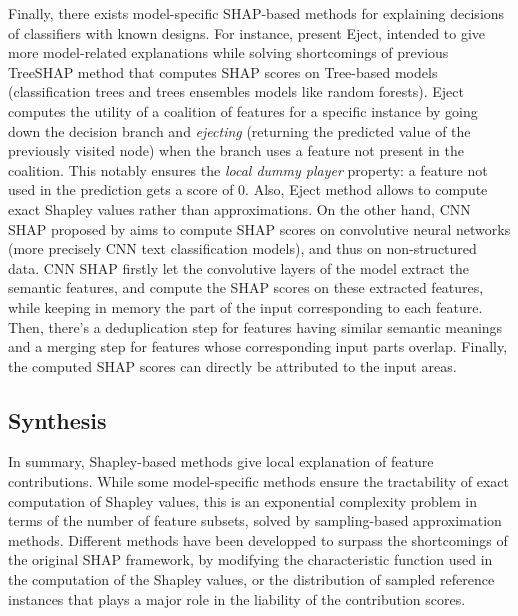 Finally, there exists model-specific SHAP-based methods for explaining decisions of classifiers with known designs. 
For instance, \textcite{campbell_exact_2022} present Eject, intended to give more model-related explanations while 
solving shortcomings of previous TreeSHAP method that computes SHAP scores on Tree-based models (classification 
trees and trees ensembles models like random forests). Eject computes the utility of a coalition of features 
for a specific instance by going down the decision branch and \textit{ejecting} (returning the predicted value of the 
previously visited node) when the branch uses a feature not present in the coalition. This notably ensures the 
\textit{local dummy player} property: a feature not used in the prediction gets a score of 0. Also, Eject method allows to compute exact Shapley values rather than approximations.
On the other hand, CNN SHAP proposed by \textcite{zhao_shap_2021} aims to compute SHAP scores on convolutive neural 
networks (more precisely CNN text classification models), and thus on non-structured data. CNN SHAP firstly let 
the convolutive layers of the model extract the semantic features, and compute the SHAP scores on these extracted 
features, while keeping in memory the part of the input corresponding to each feature. Then, there's a 
deduplication step for features having similar semantic meanings and a merging step for features whose 
corresponding input parts overlap. Finally, the computed SHAP scores can directly be attributed to the input areas.


\subsection{Synthesis}

In summary, Shapley-based methods give local explanation of feature contributions. While some model-specific methods ensure the tractability of exact computation of Shapley values, this is an exponential complexity problem in terms of the number of feature subsets, solved by sampling-based approximation methods. Different methods have been developped to surpass the shortcomings of the original SHAP framework, by modifying the characteristic function used in the computation of the Shapley values, or the distribution of sampled reference instances that plays a major role in the liability of the contribution scores.


